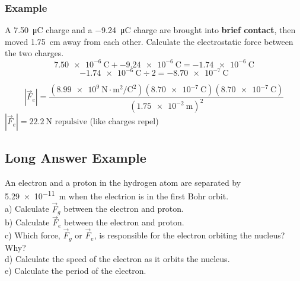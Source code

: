 \documentclass[a4paper,12pt]{article}
\begin{document}
\subsubsection{Example}
A \SI{7.50}{\micro\coulomb} charge and a \SI{-9.24}{\micro\coulomb} charge are brought into \textbf{brief contact}, then moved \SI{1.75}{\cm} away from each other. Calculate the electrostatic force between the two charges.
$$\SI{7.50e-6}{\coulomb} + \SI{-9.24e-6}{\coulomb} = \SI{-1.74e-6}{\coulomb}$$
$$\SI{-1.74e-6}{\coulomb} \div 2 = \SI{-8.70e-7}{\coulomb}$$

$$|\vec{F}_e| = \frac{(\SI{8.99e9}{\newton\cdot\m\squared\per\coulomb\squared})(\SI{8.70e-7}{\coulomb})(\SI{8.70e-7}{\coulomb})}{(\SI{1.75e-2}{\m})^2}$$
$|\vec{F}_e| = \SI{22.2}{\newton} \textrm{ repulsive}$ (like charges repel)

\subsection{Long Answer Example}
An electron and a proton in the hydrogen atom are separated by \SI{5.29e-11}{\m} when the electrion is in the first Bohr orbit.
\\a) Calculate $\vec{F}_g$ between the electron and proton.
\\b) Calculate $\vec{F}_e$ between the electron and proton.
\\c) Which force, $\vec{F}_g$ or $\vec{F}_e$, is responsible for the electron orbiting the nucleus? Why?
\\d) Calculate the speed of the electron as it orbits the nucleus.
\\e) Calculate the period of the electron.
\end{document}
